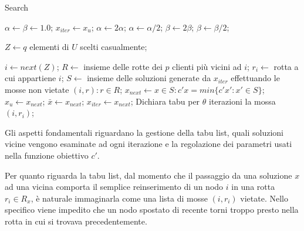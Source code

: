 \documentclass[11pt,oneside,a4paper]{article}
\begin{document}
\begin{algorithm}
\caption{Search}
\label{search}

\begin{algorithmic}[1]

  \State $\alpha \gets \beta \gets 1.0$;
  \State $x_{iter} \gets x_u$;
      \State $\alpha \gets 2\alpha$;
      \State $\alpha \gets \alpha/2$;
    \EndIf
      \State $\beta \gets 2\beta$;
      \State $\beta \gets \beta/2$;
    \EndIf

    \State $Z \gets q$ elementi di $U$ scelti casualmente;

      \State $i \gets next(Z)$;
      \State $R \gets$ insieme delle rotte dei $p$ clienti più vicini ad $i$;
      \State $r_i \gets$ rotta a cui appartiene $i$;
      \State $S \gets$ insieme delle soluzioni generate da $x_{iter}$ effettuando le mosse
             non vietate $(i,r) : r \in R$;
      \State $x_{next} \gets x \in S : c'x = min\{c'x' : x' \in S\}$;
       
        \State $x_u \gets x_{next}$;
      \EndIf
        \State $\bar{x} \gets x_{next}$;
      \EndIf
      \State $x_{iter} \gets x_{next}$;
      \State Dichiara tabu per $\theta$ iterazioni la mossa $(i,r_i)$;
      \Comment{$\theta \in [5,10]$}
    \EndWhile
  \EndWhile

\end{algorithmic}
\end{algorithm}

Gli aspetti fondamentali riguardano la gestione della tabu list, quali soluzioni vicine vengono
esaminate ad ogni iterazione e la regolazione dei parametri usati nella funzione obiettivo $c'$.

Per quanto riguarda la tabu list, dal momento che il passaggio da una soluzione $x$ ad una vicina
comporta il semplice reinserimento di un nodo $i$ in una rotta $r_i \in R_x$, è naturale
immaginarla come una lista di mosse $(i,r_i)$ vietate. Nello specifico viene impedito che un
nodo spostato di recente torni troppo presto nella rotta in cui si trovava precedentemente.
\end{document}
